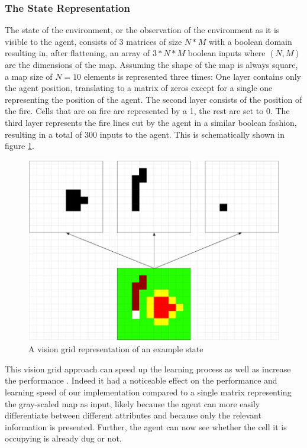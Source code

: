 \subsubsection{The State Representation}\label{sec:state_rep}
The state of the environment, or the observation of the environment as it is visible to the agent, consists of 3 matrices of size $N*M$ with a boolean domain resulting in, after flattening, an array of $3 * N*M$ boolean inputs where $(N, M)$ are the dimensions of the map. Assuming the shape of the map is always square, a map size of $N=10$ elements is represented three times: One layer contains only the agent position, translating to a matrix of zeros except for a single one representing the position of the agent. The second layer consists of the position of the fire. Cells that are on fire are represented by a 1, the rest are set to 0. The third layer represents the fire lines cut by the agent in a similar boolean fashion, resulting in a total of 300 inputs to the agent. This is schematically shown in figure \ref{fig:visiongrid}.

\begin{figure}[h]
    \centering
    \includegraphics[width=1\linewidth]{img/Vision_Grid.png}
    \caption{A vision grid representation of an example state}
    \label{fig:visiongrid}
\end{figure}

This vision grid approach can speed up the learning process as well as increase the performance \citep{knegt2018opponent}. Indeed it had a noticeable effect on the performance and learning speed of our implementation compared to a single matrix representing the gray-scaled map as input, likely because the agent can more easily differentiate between different attributes and because only the relevant information is presented. Further, the agent can now see whether the cell it is occupying is already dug or not.


